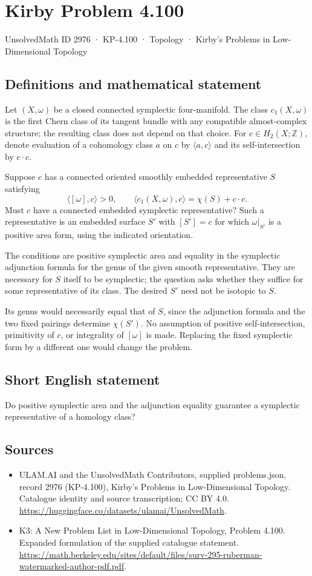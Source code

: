 \documentclass[11pt,a4paper]{article}
\begin{document}
\section*{Kirby Problem 4.100}\label{2976}
{\small UnsolvedMath ID 2976 · KP-4.100 · Topology · Kirby's Problems in Low-Dimensional Topology}
\subsection{Definitions and mathematical statement}
Let $(X,\omega)$ be a closed connected symplectic four-manifold. The class $c_1(X,\omega)$ is the first Chern class of its tangent bundle with any compatible almost-complex structure; the resulting class does not depend on that choice. For $c\in H_2(X;\mathbb Z)$, denote evaluation of a cohomology class $a$ on $c$ by $\langle a,c\rangle$ and its self-intersection by $c\cdot c$.

Suppose $c$ has a connected oriented smoothly embedded representative $S$ satisfying
\[
\langle[\omega],c\rangle>0,
\qquad
\langle c_1(X,\omega),c\rangle
=\chi(S)+c\cdot c.
\]
Must $c$ have a connected embedded symplectic representative? Such a representative is an embedded surface $S'$ with $[S']=c$ for which $\omega|_{S'}$ is a positive area form, using the indicated orientation.

The conditions are positive symplectic area and equality in the symplectic adjunction formula for the genus of the given smooth representative. They are necessary for $S$ itself to be symplectic; the question asks whether they suffice for some representative of its class. The desired $S'$ need not be isotopic to $S$.

Its genus would necessarily equal that of $S$, since the adjunction formula and the two fixed pairings determine $\chi(S')$. No assumption of positive self-intersection, primitivity of $c$, or integrality of $[\omega]$ is made. Replacing the fixed symplectic form by a different one would change the problem.
\subsection{Short English statement}
Do positive symplectic area and the adjunction equality guarantee a symplectic representative of a homology class?
\subsection{Sources}
\begin{itemize}
\item[S1] ULAM.AI and the UnsolvedMath Contributors, supplied problems.json, record 2976 (KP-4.100), Kirby's Problems in Low-Dimensional Topology. Catalogue identity and source transcription; CC BY 4.0.
\url{https://huggingface.co/datasets/ulamai/UnsolvedMath}.
\item[S2] K3: A New Problem List in Low-Dimensional Topology, Problem 4.100. Expanded formulation of the supplied catalogue statement.
\url{https://math.berkeley.edu/sites/default/files/surv-295-ruberman-watermarked-author-pdf.pdf}.
\end{itemize}
\end{document}
